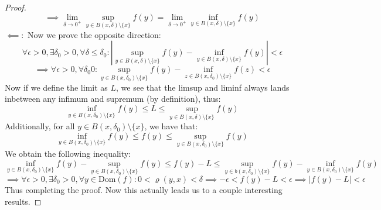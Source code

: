 \documentclass[10pt,letterpaper]{article} %
\begin{document}
\begin{proof}
\begin{equation*}
  \implies \lim_{\delta \xrightarrow{} 0^+}\sup_{y \in B(x, \delta)\setminus \{x\}}f(y) = \lim_{\delta \xrightarrow{} 0^+}\inf_{y \in B(x, \delta)\setminus \{x\}}f(y)
\end{equation*}
$\impliedby:$ Now we prove the opposite direction:
\begin{equation*}
\forall \epsilon > 0, \exists \delta_0 > 0, \forall \delta \leqslant \delta_0: \left|\sup_{y \in B(x, \delta)\setminus \{x\}}f(y) - \inf_{y \in B(x, \delta)\setminus \{x\}}f(y)\right| < \epsilon
\end{equation*}
\begin{equation*}
\implies \forall \epsilon > 0, \forall \delta_0  0: \sup_{y \in B(x, \delta_0)\setminus\{x\}}f(y) - \inf_{z \in B(x, \delta_0)\setminus\{x\}}f(z) < \epsilon
\end{equation*}
Now if we define the limit as $L$, we see that the limsup and liminf always lands inbetween any infimum and supremum (by definition), thus:
\begin{equation*}
  \inf_{y \in B(x, \delta_0)\setminus \{x\}}f(y) \leqslant L \leqslant \sup_{y \in B(x, \delta)\setminus \{x\}}f(y)
\end{equation*}
Additionally, for all $y \in B(x, \delta_0) \setminus \{x\}$, we have that: 
\begin{equation*}
\inf_{y \in B(x, \delta_0)\setminus \{x\}}f(y) \leqslant f(y) \leqslant \sup_{y \in B(x, \delta_0)\setminus \{x\}}f(y)
\end{equation*}
We obtain the following inequality:
\begin{equation*}
  \inf_{y \in B(x, \delta_0)\setminus\{x\}}f(y) - \sup_{y \in B(x, \delta_0)\setminus\{x\}}f(y) \leqslant f(y) - L \leqslant \sup_{y \in b(x, \delta_0)\setminus \{x\}}f(y) - \inf_{y \in B(x, \delta_0)\setminus\{x\}}f(y)
\end{equation*}
\begin{equation*}
  \implies \forall \epsilon > 0, \exists \delta_0 > 0, \forall y \in \text{Dom}(f): 0 < \varrho(y, x) < \delta \implies -\epsilon < f(y) - L < \epsilon \implies |f(y) - L| < \epsilon
\end{equation*}
Thus completing the proof. Now this actually leads us to a couple interesting results. 
\end{proof}
\end{document}
